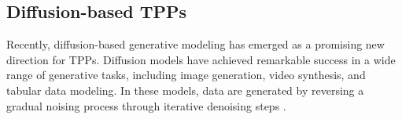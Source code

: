 \documentclass[10pt]{article} %
\begin{document}
\begin{table}[!htbp]
    \caption{Comparison of neural TPP architectures.}
    \label{table4}
    \centering
\end{table}


\subsection{Diffusion-based TPPs}
\label{diffusion_tpp}

Recently, diffusion-based generative modeling has emerged as a promising new direction for TPPs. Diffusion models have achieved remarkable success in a wide range of generative tasks, including image generation, video synthesis, and tabular data modeling. In these models, data are generated by reversing a gradual noising process through iterative denoising steps \citep{song2020score}. 


\end{document}
